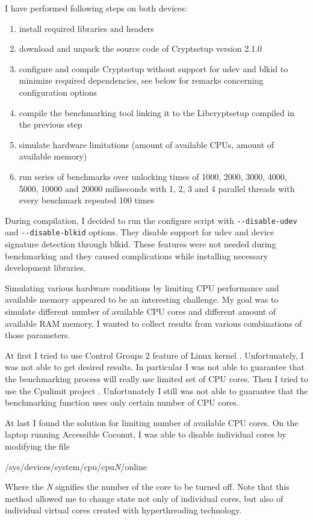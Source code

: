 \documentclass[nolof]{fithesis3}
\begin{document}
I have performed following steps on both devices:

\begin{enumerate}
\item install required libraries and headers

\item download and unpack the source code of Cryptsetup version 2.1.0

\item configure and compile Cryptsetup without support for udev and blkid to minimize required dependencies, see below for remarks concerning configuration options

\item compile the benchmarking tool linking it to the Libcryptsetup compiled in the previous step

\item simulate hardware limitations (amount of available CPUs, amount of available memory)

\item run series of benchmarks over unlocking times of 1000, 2000, 3000, 4000, 5000, 10000 and 20000 miliseconds with 1, 2, 3 and 4 parallel threads with every benchmark repeated 100 times
\end{enumerate}

During compilation, I decided to run the configure script with \verb+--disable-udev+ and \verb+--disable-blkid+ options. They disable support for udev and device signature detection through blkid. These features were not needed during benchmarking and they caused complications while installing necessary development libraries.

Simulating various hardware conditions by limiting CPU performance and available memory appeared to be an interesting challenge. My goal was to simulate different number of available CPU cores and different amount of available RAM memory. I wanted to collect results from various combinations of those parameters.

At first I tried to use Control Groups 2 feature of Linux kernel \parencite{cgroups2}. Unfortunately, I was not able to get desired results. In particular I was not able to guarantee that the benchmarking process will really use limited set of CPU cores. Then I tried to use the Cpulimit project \parencite{cpulimit}. Unfortunately I still was not able to guarantee that the benchmarking function uses only certain number of CPU cores.

At last I found the solution for limiting number of available CPU cores. On the laptop running Accessible Coconut, I was able to disable individual cores by modifying the file 
\begin{tt}
/sys/devices/system/cpu/cpu\emph{N}/online
\end{tt}
 Where the \emph{N} signifies the number of the core to be turned off. Note that this method allowed me to change state not only of individual cores, but also of individual virtual cores created with hyperthreading technology.
\end{document}
